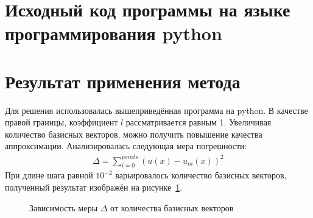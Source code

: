 \documentclass[12pt,a4paper,oneside]{extarticle}
\begin{document}
\clearpage    
\section{Исходный код программы на языке программирования python}
     

\section{Результат применения метода}
    Для решения использовалась вышеприведённая программа на python. В качестве правой границы, коэффициент $l$ рассматривается равным 1. Увеличивая количество базисных векторов, можно получить повышение качества аппроксимации. Анализировалась следующая мера погрешности:
    \begin{gather}
        \Delta = \sum\limits_{i=0}^{points} (u(x) - u_m(x))^2 \nonumber
    \end{gather}
    При длине шага равной $10^{-2}$ варьировалось количество базисных векторов, полученный результат изображён на рисунке~\ref{pic:res}.

    \begin{figure}[ht!]
        \centering
        \caption{Зависимость меры $\Delta$ от количества базисных векторов}
        \label{pic:res}
    \end{figure}
\end{document}

